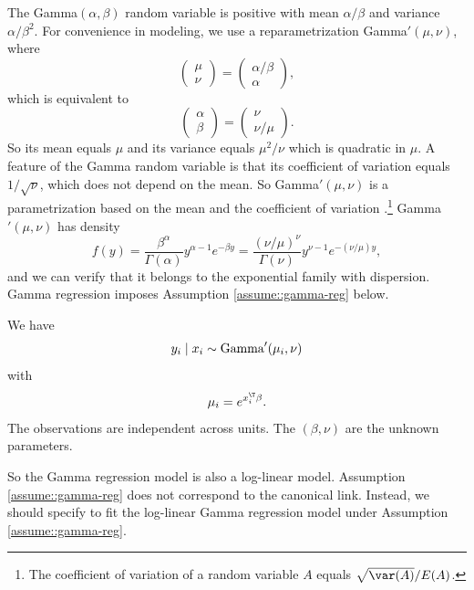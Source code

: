 The Gamma$(\alpha, \beta)$ random variable is positive with mean $\alpha/\beta$ and variance $\alpha/\beta^2$. For convenience in modeling, we use a reparametrization Gamma$'(\mu, \nu)$, where  
$$
\begin{pmatrix}
\mu \\
\nu
\end{pmatrix}
= \begin{pmatrix}
\alpha/\beta \\
\alpha 
\end{pmatrix}
,
$$
which is equivalent to
$$
\begin{pmatrix}
\alpha \\
\beta
\end{pmatrix}
= \begin{pmatrix}
\nu\\
\nu / \mu 
\end{pmatrix}.
$$
So its mean equals $\mu$ and its variance equals $\mu^2 / \nu$ which is quadratic in $\mu$. A feature of the Gamma random variable is that its coefficient of variation equals $1 /  \sqrt{\nu}$, which does not depend on the mean. So  Gamma$'(\mu, \nu)$ is a parametrization based on the mean and the coefficient of variation \citep{mccullagh1989generalized}.\footnote{The coefficient of variation of a random variable $A$ equals  $\sqrt{\var(A)} / E(A)$. } 
Gamma$'(\mu, \nu)$ has density
$$
f(y)  =  \frac{\beta^\alpha }{ \Gamma (\alpha) } y^{\alpha - 1} e^{- \beta y} 
=  \frac{ (\nu / \mu )^\nu }{ \Gamma (\nu) } y^{\nu - 1} e^{- (\nu / \mu ) y} ,
$$ 
and we can verify that it belongs to the exponential family with dispersion. 
Gamma regression imposes Assumption \ref{assume::gamma-reg} below. 

\begin{assumption}
\label{assume::gamma-reg}
We have 
$$
y_i \mid x_i \sim \textup{Gamma}' (\mu_i, \nu)
$$
with 
$$
\mu_i = e^{x_i^{\T} \beta}.
$$
The observations are independent across units. The $(\beta, \nu)$ are the unknown parameters. 
\end{assumption}
So the Gamma regression model is also a log-linear model. Assumption \ref{assume::gamma-reg} does not correspond to the canonical link. Instead, we should specify  to fit the log-linear Gamma regression model under Assumption \ref{assume::gamma-reg}. 

